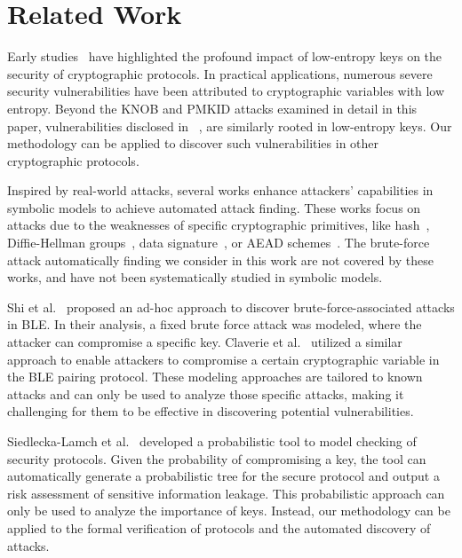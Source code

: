 \documentclass[../main.tex]{subfiles}  %
\begin{document}
\section{Related Work} \label{sec:7related-work}

Early studies~\cite{gong1993protecting,kelsey1997secure} have highlighted the profound impact of low-entropy keys on the security of cryptographic protocols. In practical applications, numerous severe security vulnerabilities have been attributed to cryptographic variables with low entropy. 
Beyond the KNOB and PMKID attacks examined in detail in this paper, vulnerabilities disclosed in ~\cite{jangid2023bluepe,schneier1998cryptanalysis,ferguson1999cryptographic,gpgcracking}, are similarly rooted in low-entropy keys.
Our methodology can be applied to discover such vulnerabilities in other cryptographic protocols.

Inspired by real-world attacks, several works enhance attackers' capabilities in symbolic models to achieve automated attack finding.
These works focus on attacks due to the weaknesses of specific cryptographic primitives, like hash~\cite{cheval2023hash}, Diffie-Hellman groups~\cite{cremers2019prime}, data signature~\cite{jackson2019sign}, or AEAD schemes~\cite{cremers2023aead}. 
The brute-force attack automatically finding we consider in this work are not covered by these works, and have not been systematically studied in symbolic models. 

Shi et al.~\cite{shi2023blesc} proposed an ad-hoc approach to discover brute-force-associated attacks in BLE.
In their analysis, a fixed brute force attack was modeled, where the attacker can compromise a specific key. 
Claverie et al.~\cite{claverie2023tamarin,jangid2023bluepe} utilized a similar approach to enable attackers to compromise a certain cryptographic variable in the BLE pairing protocol.
These modeling approaches are tailored to known attacks and can only be used to analyze those specific attacks, making it challenging for them to be effective in discovering potential vulnerabilities.

Siedlecka-Lamch et al.~\cite{siedlecka2016probabilistic} developed a probabilistic tool to model checking of security protocols. 
Given the probability of compromising a key, the tool can automatically generate a probabilistic tree for the secure protocol and output a risk assessment of sensitive information leakage.
This probabilistic approach can only be used to analyze the importance of keys.
Instead, our methodology can be applied to the formal verification of protocols and the automated discovery of attacks. 

\end{document}
